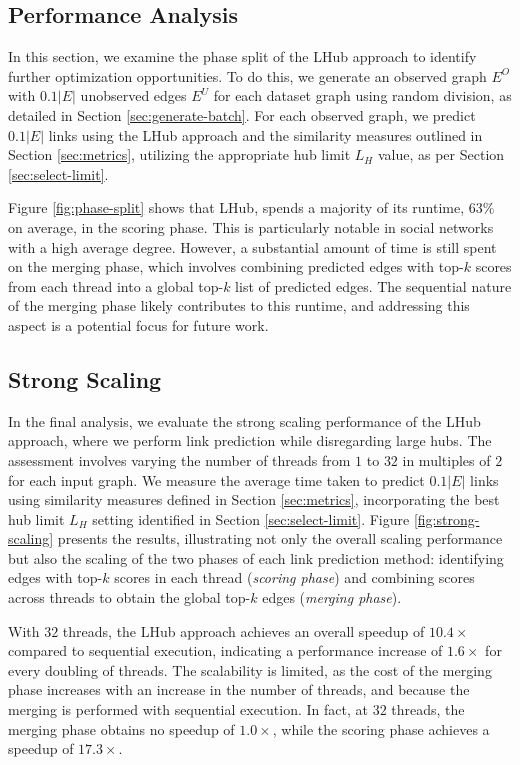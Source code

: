 \subsection{Performance Analysis}

In this section, we examine the phase split of the LHub approach to identify further optimization opportunities. To do this, we generate an observed graph $E^O$ with $0.1|E|$ unobserved edges $E^U$ for each dataset graph using random division, as detailed in Section \ref{sec:generate-batch}. For each observed graph, we predict $0.1|E|$ links using the LHub approach and the similarity measures outlined in Section \ref{sec:metrics}, utilizing the appropriate hub limit $L_H$ value, as per Section \ref{sec:select-limit}.

Figure \ref{fig:phase-split} shows that LHub, spends a majority of its runtime, $63\%$ on average, in the scoring phase. This is particularly notable in social networks with a high average degree. However, a substantial amount of time is still spent on the merging phase, which involves combining predicted edges with top-$k$ scores from each thread into a global top-$k$ list of predicted edges. The sequential nature of the merging phase likely contributes to this runtime, and addressing this aspect is a potential focus for future work.




\subsection{Strong Scaling}

In the final analysis, we evaluate the strong scaling performance of the LHub approach, where we perform link prediction while disregarding large hubs. The assessment involves varying the number of threads from $1$ to $32$ in multiples of $2$ for each input graph. We measure the average time taken to predict $0.1|E|$ links using similarity measures defined in Section \ref{sec:metrics}, incorporating the best hub limit $L_H$ setting identified in Section \ref{sec:select-limit}. Figure \ref{fig:strong-scaling} presents the results, illustrating not only the overall scaling performance but also the scaling of the two phases of each link prediction method: identifying edges with top-$k$ scores in each thread (\textit{scoring phase}) and combining scores across threads to obtain the global top-$k$ edges (\textit{merging phase}).

With $32$ threads, the LHub approach achieves an overall speedup of $10.4\times$ compared to sequential execution, indicating a performance increase of $1.6\times$ for every doubling of threads. The scalability is limited, as the cost of the merging phase increases with an increase in the number of threads, and because the merging is performed with sequential execution. In fact, at $32$ threads, the merging phase obtains no speedup of $1.0\times$, while the scoring phase achieves a speedup of $17.3\times$.
